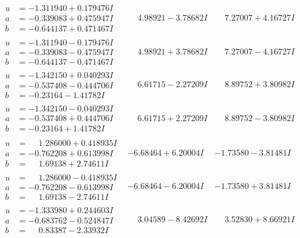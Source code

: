 \documentclass[1p]{elsarticle_modified}
\theoremstyle{definition}
\begin{document}
$$\begin{array}{c|c|c}
\begin{aligned}
u &= -1.311940 + 0.179476 I \\
a &= -0.339083 + 0.475947 I \\
b &= -0.644137 + 0.471467 I\end{aligned}
 & \phantom{-}4.98921 - 3.78682 I & \phantom{-}7.27007 + 4.16727 I \\ \hline\begin{aligned}
u &= -1.311940 - 0.179476 I \\
a &= -0.339083 - 0.475947 I \\
b &= -0.644137 - 0.471467 I\end{aligned}
 & \phantom{-}4.98921 + 3.78682 I & \phantom{-}7.27007 - 4.16727 I \\ \hline\begin{aligned}
u &= -1.342150 + 0.040293 I \\
a &= -0.537408 - 0.444706 I \\
b &= -0.23164 - 1.41782 I\end{aligned}
 & \phantom{-}6.61715 - 2.27209 I & \phantom{-}8.89752 + 3.80982 I \\ \hline\begin{aligned}
u &= -1.342150 - 0.040293 I \\
a &= -0.537408 + 0.444706 I \\
b &= -0.23164 + 1.41782 I\end{aligned}
 & \phantom{-}6.61715 + 2.27209 I & \phantom{-}8.89752 - 3.80982 I \\ \hline\begin{aligned}
u &= \phantom{-}1.286000 + 0.418935 I \\
a &= -0.762208 + 0.613998 I \\
b &= \phantom{-}1.69138 + 2.74611 I\end{aligned}
 & -6.68464 + 6.20004 I & -1.73580 - 3.81481 I \\ \hline\begin{aligned}
u &= \phantom{-}1.286000 - 0.418935 I \\
a &= -0.762208 - 0.613998 I \\
b &= \phantom{-}1.69138 - 2.74611 I\end{aligned}
 & -6.68464 - 6.20004 I & -1.73580 + 3.81481 I \\ \hline\begin{aligned}
u &= -1.333980 + 0.244603 I \\
a &= -0.683762 - 0.524847 I \\
b &= \phantom{-}0.83387 - 2.33932 I\end{aligned}
 & \phantom{-}3.04589 - 8.42692 I & \phantom{-}3.52830 + 8.66921 I \\ \hline\begin{aligned}

\end{aligned}
\end{array}$$
\end{document}
